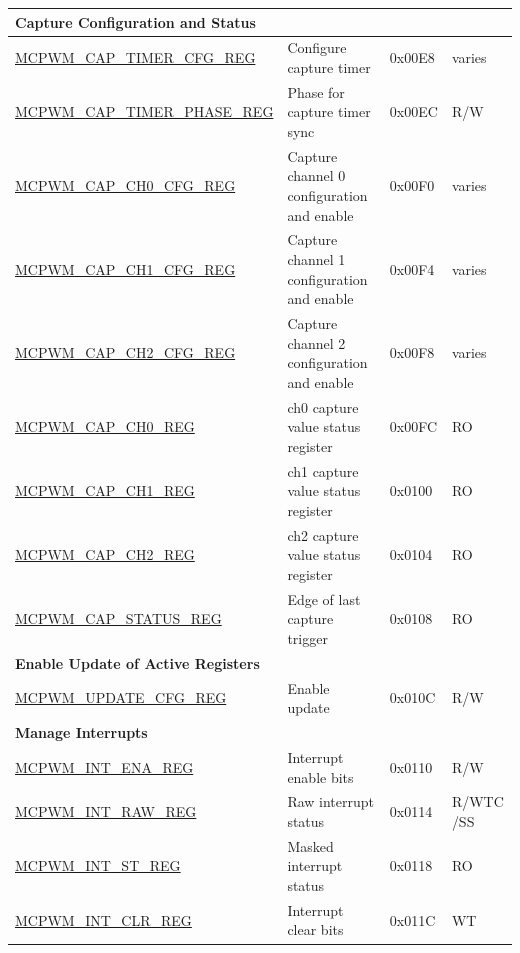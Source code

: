 \begin{longtable}{ | p{6cm} | p{7.2cm} | p{1.3cm} | p{1cm} | }
\multicolumn{4}{|l|}{\textbf{Capture Configuration and Status}} \\ \hline
\hyperref[regdesc:MCPWMCAPTIMERCFGREG]{MCPWM\_CAP\_TIMER\_CFG\_REG} & Configure capture timer & 0x00E8 & varies \\ \hline
\hyperref[regdesc:MCPWMCAPTIMERPHASEREG]{MCPWM\_CAP\_TIMER\_PHASE\_REG} & Phase for capture timer sync & 0x00EC & R/W \\ \hline
\hyperref[regdesc:MCPWMCAPCH0CFGREG]{MCPWM\_CAP\_CH0\_CFG\_REG} & Capture channel 0 configuration and enable & 0x00F0 & varies \\ \hline
\hyperref[regdesc:MCPWMCAPCH1CFGREG]{MCPWM\_CAP\_CH1\_CFG\_REG} & Capture channel 1 configuration and enable & 0x00F4 & varies \\ \hline
\hyperref[regdesc:MCPWMCAPCH2CFGREG]{MCPWM\_CAP\_CH2\_CFG\_REG} & Capture channel 2 configuration and enable & 0x00F8 & varies \\ \hline
\hyperref[regdesc:MCPWMCAPCH0REG]{MCPWM\_CAP\_CH0\_REG} & ch0 capture value status register & 0x00FC & RO \\ \hline
\hyperref[regdesc:MCPWMCAPCH1REG]{MCPWM\_CAP\_CH1\_REG} & ch1 capture value status register & 0x0100 & RO \\ \hline
\hyperref[regdesc:MCPWMCAPCH2REG]{MCPWM\_CAP\_CH2\_REG} & ch2 capture value status register & 0x0104 & RO \\ \hline
\hyperref[regdesc:MCPWMCAPSTATUSREG]{MCPWM\_CAP\_STATUS\_REG} & Edge of last capture trigger & 0x0108 & RO \\ \hline
\multicolumn{4}{|l|}{\textbf{Enable Update of Active Registers}} \\ \hline
\hyperref[regdesc:MCPWMUPDATECFGREG]{MCPWM\_UPDATE\_CFG\_REG} & Enable update & 0x010C & R/W \\ \hline

\multicolumn{4}{|l|}{\textbf{Manage Interrupts}} \\ \hline
\hyperref[regdesc:MCPWMINTENAREG]{MCPWM\_INT\_ENA\_REG} & Interrupt enable bits & 0x0110 & R/W \\ \hline
\hyperref[regdesc:MCPWMINTRAWREG]{MCPWM\_INT\_RAW\_REG} & Raw interrupt status & 0x0114 & R/WTC
/SS \\ \hline
\hyperref[regdesc:MCPWMINTSTREG]{MCPWM\_INT\_ST\_REG} & Masked interrupt status & 0x0118 & RO \\ \hline
\hyperref[regdesc:MCPWMINTCLRREG]{MCPWM\_INT\_CLR\_REG} & Interrupt clear bits & 0x011C & WT \\ \hline


\end{longtable}
